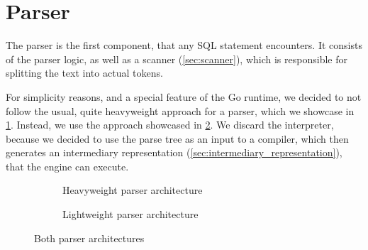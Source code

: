 \section{Parser}
\label{sec:parser}
The parser is the first component, that any SQL statement encounters.
It consists of the parser logic, as well as a scanner (\ref{sec:scanner}), which is responsible for splitting the text into actual tokens.

For simplicity reasons, and a special feature of the Go runtime, we decided to not follow the usual, quite heavyweight approach for a parser, which we showcase in \ref{fig:heavyweight_parser_arch}.
Instead, we use the approach showcased in \ref{fig:lightweight_parser_arch}.
We discard the interpreter, because we decided to use the parse tree as an input to a compiler, which then generates an intermediary representation (\ref{sec:intermediary_representation}), that the engine can execute.

\begin{figure}
    \centering
    \begin{subfigure}{.5\textwidth}
        \centering
        \caption{Heavyweight parser architecture}
        \label{fig:heavyweight_parser_arch}
    \end{subfigure}%
    \begin{subfigure}{.5\textwidth}
        \centering
        \caption{Lightweight parser architecture}
        \label{fig:lightweight_parser_arch}
    \end{subfigure}
    \caption{Both parser architectures}
    \label{fig:parser_archs}
\end{figure}


